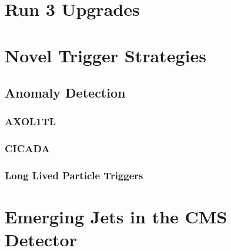 \section{Run 3 Upgrades}

\section{Novel Trigger Strategies}

\subsection{Anomaly Detection}
\subsubsection{AXOL1TL}

\subsubsection{CICADA}

\subsubsection{Long Lived Particle Triggers}

\section{Emerging Jets in the CMS Detector}
